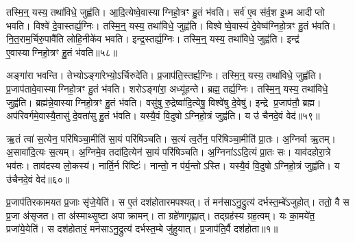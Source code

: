 तस्मि॒न्॒ यस्य॒ तथा॑विधे॒ जुह्व॑ति।
आ॒दि॒त्येष्वे॒वास्याग्निहो॒त्रꣳ हु॒तं भ॑वति।
सर्व॑ ए॒व स॑र्व॒श इ॒ध्म आदीप्तो भवति।
विश्वे॑ दे॒वास्तर्ह्य॒ग्निः।
तस्मि॒न्॒ यस्य॒ तथा॑विधे॒ जुह्व॑ति।
विश्वेष्वे॒वास्य॑ दे॒वेष्व॑ग्निहो॒त्रꣳ हु॒तं भ॑वति।
नि॒त॒राम॒र्चिरु॒पावै॑ति लोहि॒नीके॑व भवति।
इन्द्र॒स्तर्ह्य॒ग्निः।
तस्मि॒न्॒ यस्य॒ तथा॑विधे॒ जुह्व॑ति।
इन्द्र॑ ए॒वास्याग्निहो॒त्रꣳ हु॒तं भ॑वति॥५८॥

अङ्गा॑रा भवन्ति।
तेभ्यो\-ऽङ्गा॑रेभ्यो॒\-ऽर्चिरुदे॑ति।
प्र॒जा\-प॑ति॒\-स्तर्ह्य॒ग्निः।
तस्मि॒न्॒ यस्य॒ तथा॑विधे॒ जुह्व॑ति।
प्र॒जाप॑तावे॒वास्याग्निहो॒त्रꣳ हु॒तं भ॑वति।
शरोऽङ्गा॑रा॒ अध्यू॑हन्ते।
ब्रह्म॒ तर्ह्य॒ग्निः।
तस्मि॒न्॒ यस्य॒ तथा॑विधे॒ जुह्व॑ति।
ब्रह्म॑न्ने॒वास्याग्निहो॒त्रꣳ हु॒तं भ॑वति।
वसु॑षु रु॒द्रेष्वा॑दि॒त्येषु॒ विश्वे॑षु दे॒वेषु॑।
इन्द्रे प्र॒जाप॑तौ॒ ब्रह्म\sn{}।
अप॑रिवर्गमे॒वास्यै॒तासु॑ दे॒वता॑सु हु॒तं भ॑वति।
यस्यै॒वं वि॒दुषो\-ऽग्निहो॒त्रं जुह्व॑ति।
य उ॑ चैनदे॒वं वेद॑॥५९॥\anuvakamend[आ॒दि॒त्यास्तर्ह्य॒ग्निरिन्द्र॑ ए॒वास्याग्निहो॒त्रꣳ हु॒तं भ॑वति दे॒वेषु॑ च॒त्वारि॑ च (यद॒ग्निन्निहि॑तः प्रथ॒मꣳ सर्व॑ ए॒व नि॑त॒रामङ्गा॑राः॒ शरो\-ऽङ्गा॑रा॒ ब्रह्म॒ वसु॑ष्व॒ष्टौ॥)]

ऋ॒तं त्वा॑ स॒त्येन॒ परि॑षिञ्चा॒मीति॑ सा॒यं परि॑षिञ्चति।
स॒त्यं त्व॒र्तेन॒ परि॑षिञ्चा॒मीति॑ प्रा॒तः।
अ॒ग्निर्वा ऋ॒तम्।
अ॒सावा॑दि॒त्यः स॒त्यम्।
अ॒ग्निमे॒व तदा॑दि॒त्येन॑ सा॒यं परि॑षिञ्चति।
अ॒ग्निना॑\-ऽऽदि॒त्यं प्रा॒तः सः।
याव॑दहोरा॒त्रे भव॑तः।
ताव॑दस्य लो॒कस्य॑।
नार्ति॒र्न रिष्टिः॑।
नान्तो॒ न प॑र्य॒न्तो\-ऽस्ति।
यस्यै॒वं वि॒दुषो\-ऽग्निहो॒त्रं जुह्व॑ति।
य उ॑चैनदे॒वं वेद॑॥६०॥\anuvakamend[अ॒स्ति॒ द्वे च॑]




\clearpage
{}
\setcounter{anuvakam}{0}

प्र॒जाप॑तिरकामयत प्र॒जाः सृ॑जे॒येति॑।
स ए॒तं दश॑होतारम\-पश्यत्।
तं मन॑सा\-ऽनु॒द्रुत्य॑ दर्भस्त॒म्बे॑\-ऽजुहोत्।
ततो॒ वै स प्र॒जा अ॑सृजत।
ता अ॑स्माथ्सृ॒ष्टा अपाक्रामन्।
ता ग्रहे॑णागृह्णात्।
तद्ग्रह॑स्य ग्रह॒त्वम्।
यः का॒मये॑त॒ प्रजा॑ये॒येति॑।
स दश॑होतारं॒ मन॑सा\-ऽनु॒द्रुत्य॑ दर्भस्त॒म्बे जु॑हुयात्।
प्र॒जाप॑ति॒र्वै दश॑होता॥१॥

